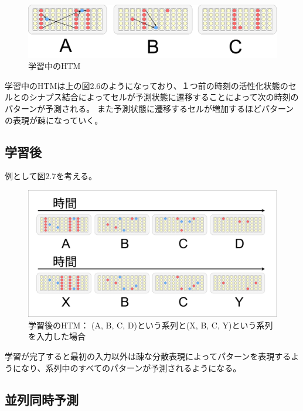 \begin{figure}[ht]
  \begin{center}
    \includegraphics[width=14cm]{./fig/drawing_7}
    \caption{学習中のHTM}
    \label{fig:HTM_during_learning}
  \end{center}
\end{figure}

学習中のHTMは上の図2.6のようになっており、１つ前の時刻の活性化状態のセルとのシナプス結合によってセルが予測状態に遷移することによって次の時刻のパターンが予測される。
また予測状態に遷移するセルが増加するほどパターンの表現が疎になっていく。

\subsection{学習後}
例として図2.7を考える。

\begin{figure}[ht]
  \begin{center}
    \includegraphics[width=14cm]{./fig/drawing_6}
    \caption{学習後のHTM： (A, B, C, D)という系列と(X, B, C, Y)という系列を入力した場合}
    \label{fig:HTM_after_learning}
  \end{center}
\end{figure}

学習が完了すると最初の入力以外は疎な分散表現によってパターンを表現するようになり、系列中のすべてのパターンが予測されるようになる。

\newpage
\subsection{並列同時予測}

